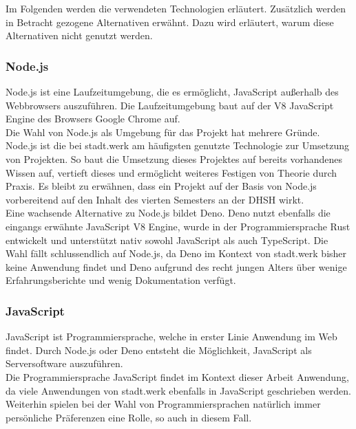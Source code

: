 \documentclass[a4paper]{scrartcl}
\begin{document}
Im Folgenden werden die verwendeten Technologien erläutert. Zusätzlich werden in Betracht gezogene Alternativen erwähnt. Dazu wird erläutert, warum diese Alternativen nicht genutzt werden.

\subsubsection{Node.js}
Node.js ist eine Laufzeitumgebung, die es ermöglicht, JavaScript außerhalb des Webbrowsers auszuführen. Die Laufzeitumgebung baut auf der V8 JavaScript Engine des Browsers Google Chrome auf. \\
Die Wahl von Node.js als Umgebung für das Projekt hat mehrere Gründe. Node.js ist die bei stadt.werk am häufigsten genutzte Technologie zur Umsetzung von Projekten. So baut die Umsetzung dieses Projektes auf bereits vorhandenes Wissen auf, vertieft dieses und ermöglicht weiteres Festigen von Theorie durch Praxis. Es bleibt zu erwähnen, dass ein Projekt auf der Basis von Node.js vorbereitend auf den Inhalt des vierten Semesters an der DHSH wirkt. \\

Eine wachsende Alternative zu Node.js bildet Deno. Deno nutzt ebenfalls die eingangs erwähnte JavaScript V8 Engine, wurde in der Programmiersprache Rust entwickelt und unterstützt nativ sowohl JavaScript als auch TypeScript. Die Wahl fällt schlussendlich auf Node.js, da Deno im Kontext von stadt.werk bisher keine Anwendung findet und Deno aufgrund des recht jungen Alters über wenige Erfahrungsberichte und wenig Dokumentation verfügt.

\subsubsection{JavaScript}
JavaScript ist Programmiersprache, welche in erster Linie Anwendung im Web findet. Durch Node.js oder Deno entsteht die Möglichkeit, JavaScript als Serversoftware auszuführen. \\
Die Programmiersprache JavaScript findet im Kontext dieser Arbeit Anwendung, da viele Anwendungen von stadt.werk ebenfalls in JavaScript geschrieben werden. Weiterhin spielen bei der Wahl von Programmiersprachen natürlich immer persönliche Präferenzen eine Rolle, so auch in diesem Fall. \\
\end{document}
